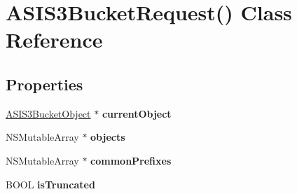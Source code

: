 \hypertarget{interface_a_s_i_s3_bucket_request_07_08}{
\section{\-A\-S\-I\-S3\-Bucket\-Request() \-Class \-Reference}
\label{interface_a_s_i_s3_bucket_request_07_08}
}
\subsection*{\-Properties}
\begin{DoxyCompactItemize}
\item 
\hypertarget{interface_a_s_i_s3_bucket_request_07_08_a6618310bfeb04e41eb156c8a396ffb4a}{
\hyperlink{interface_a_s_i_s3_bucket_object}{\-A\-S\-I\-S3\-Bucket\-Object} $\ast$ {\bfseries current\-Object}}
\label{interface_a_s_i_s3_bucket_request_07_08_a6618310bfeb04e41eb156c8a396ffb4a}

\item 
\hypertarget{interface_a_s_i_s3_bucket_request_07_08_a5de95d75e5fb499e053fa8341e460bcc}{
\-N\-S\-Mutable\-Array $\ast$ {\bfseries objects}}
\label{interface_a_s_i_s3_bucket_request_07_08_a5de95d75e5fb499e053fa8341e460bcc}

\item 
\hypertarget{interface_a_s_i_s3_bucket_request_07_08_a3c7b881b78eb9ca8c34b26404d826ceb}{
\-N\-S\-Mutable\-Array $\ast$ {\bfseries common\-Prefixes}}
\label{interface_a_s_i_s3_bucket_request_07_08_a3c7b881b78eb9ca8c34b26404d826ceb}

\item 
\hypertarget{interface_a_s_i_s3_bucket_request_07_08_a356558c7a7f521adb95167e01adb4f06}{
\-B\-O\-O\-L {\bfseries is\-Truncated}}
\label{interface_a_s_i_s3_bucket_request_07_08_a356558c7a7f521adb95167e01adb4f06}

\end{DoxyCompactItemize}


